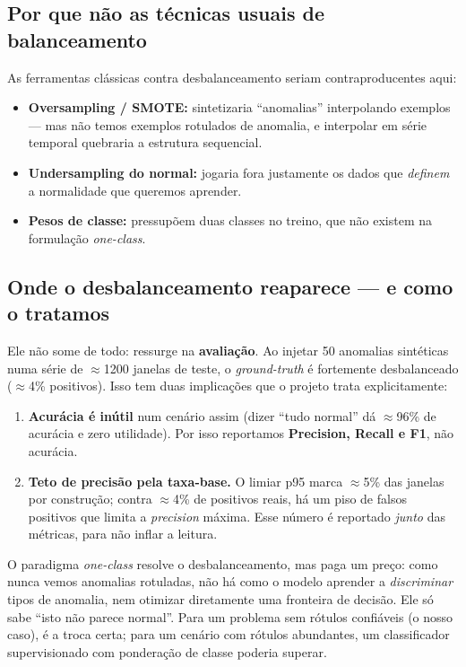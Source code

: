 \subsection{Por que não as técnicas usuais de balanceamento}
As ferramentas clássicas contra desbalanceamento seriam contraproducentes aqui:
\begin{itemize}[noitemsep]
  \item \textbf{Oversampling / SMOTE:} sintetizaria ``anomalias'' interpolando
        exemplos --- mas não temos exemplos rotulados de anomalia, e interpolar
        em série temporal quebraria a estrutura sequencial.
  \item \textbf{Undersampling do normal:} jogaria fora justamente os dados que
        \emph{definem} a normalidade que queremos aprender.
  \item \textbf{Pesos de classe:} pressupõem duas classes no treino, que não
        existem na formulação \emph{one-class}.
\end{itemize}

\subsection{Onde o desbalanceamento reaparece --- e como o tratamos}
Ele não some de todo: ressurge na \textbf{avaliação}. Ao injetar 50 anomalias
sintéticas numa série de $\approx$1200 janelas de teste, o \emph{ground-truth} é
fortemente desbalanceado ($\approx$4\% positivos). Isso tem duas implicações que
o projeto trata explicitamente:

\begin{enumerate}[noitemsep]
  \item \textbf{Acurácia é inútil} num cenário assim (dizer ``tudo normal'' dá
        $\approx$96\% de acurácia e zero utilidade). Por isso reportamos
        \textbf{Precision, Recall e F1}, não acurácia.
  \item \textbf{Teto de precisão pela taxa-base.} O limiar p95 marca $\approx$5\%
        das janelas por construção; contra $\approx$4\% de positivos reais, há um
        piso de falsos positivos que limita a \emph{precision} máxima. Esse
        número é reportado \emph{junto} das métricas, para não inflar a leitura.
\end{enumerate}

\begin{tradeoff}
O paradigma \emph{one-class} resolve o desbalanceamento, mas paga um preço: como
nunca vemos anomalias rotuladas, não há como o modelo aprender a
\emph{discriminar} tipos de anomalia, nem otimizar diretamente uma fronteira de
decisão. Ele só sabe ``isto não parece normal''. Para um problema sem rótulos
confiáveis (o nosso caso), é a troca certa; para um cenário com rótulos
abundantes, um classificador supervisionado com ponderação de classe poderia
superar.
\end{tradeoff}
